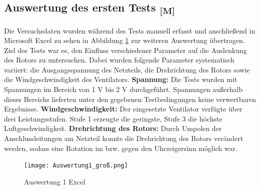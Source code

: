 \documentclass[a4paper,12pt]{article}
\begin{document}
\newpage

\subsection{\texorpdfstring{Auswertung des ersten Tests \textsubscript{[M]}}{Auswertung der ersten Tests [M]}}

Die Versuchsdaten wurden während des Tests manuell erfasst und anschließend in Microsoft Excel zu sehen in Abbildung \ref{fig:Auswertung 1 Excel} zur weiteren Auswertung übertragen. Ziel des Tests war es, den Einfluss verschiedener Parameter auf die Auslenkung des Rotors zu untersuchen.
Dabei wurden folgende Parameter systematisch variiert: die Ausgangsspannung des Netzteils, die Drehrichtung des Rotors sowie die Windgeschwindigkeit des Ventilators. \newline
\textbf{Spannung:} Die Tests wurden mit Spannungen im Bereich von 1 V bis 2 V durchgeführt. Spannungen außerhalb dieses Bereichs lieferten unter den gegebenen Testbedingungen keine verwertbaren Ergebnisse. \newline
\textbf{Windgeschwindigkeit:} Der eingesetzte Ventilator verfügte über drei Leistungsstufen. Stufe 1 erzeugte die geringste, Stufe 3 die höchste Luftgeschwindigkeit. \newline
\textbf{Drehrichtung des Rotors:} Durch Umpolen der Anschlussleitungen am Netzteil konnte die Drehrichtung des Rotors verändert werden, sodass eine Rotation im bzw. gegen den Uhrzeigersinn möglich war.

\begin{figure}[H]
    \centering
    \texttt{[image: Auswertung1\_groß.png]}
    \caption{Auswertung 1 Excel}
    \label{fig:Auswertung 1 Excel}
\end{figure}
\end{document}
